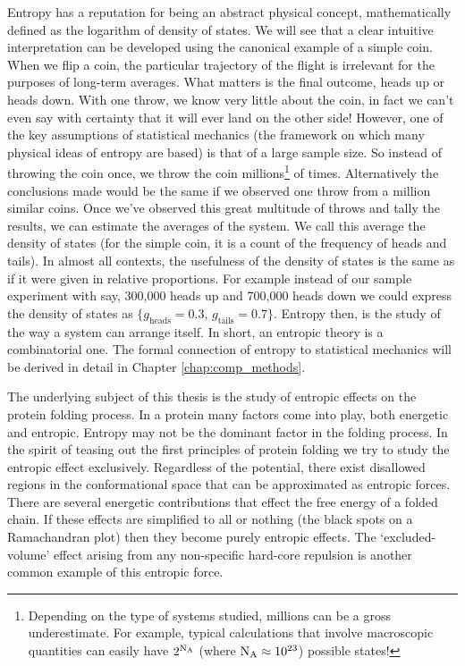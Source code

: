 Entropy has a reputation for being an abstract physical concept, mathematically defined as the logarithm of density of states. We will see that a clear intuitive interpretation can be developed using the canonical example of a simple coin. When we flip a coin, the particular trajectory of the flight is irrelevant for the purposes of long-term averages. What matters is the final outcome, heads up or  heads down. With one throw, we know very little about the coin, in fact we can't even say with certainty that it will ever land on the other side! However, one of the key assumptions of statistical mechanics (the framework on which many physical ideas of entropy are based) is that of a large sample size.  So instead of throwing the coin once, we throw the coin millions\footnote{Depending on the type of systems studied, millions can be a gross underestimate. For example, typical calculations that involve macroscopic quantities can easily have $2^{\mathrm{N_A}}$ (where $\mathrm{N_A} \approx 10^{23}$) possible states!} of times. Alternatively the conclusions made would be the same if we observed one throw from a million similar coins. Once we've observed this great multitude of throws and tally the results, we can estimate the averages of the system. We call this average the density of states (for the simple coin, it is a count of the frequency of heads and tails). In almost all contexts, the usefulness of the density of states is the same as if it were given in relative proportions. For example instead of our sample experiment with say, 300,000 heads up and 700,000 heads down we could express the density of states as $\{ g_{\text{heads}}=0.3$,  $g_{\text{tails}}=0.7 \}$. Entropy then, is the study of the way a system can arrange itself. In short, an entropic theory is a combinatorial one. The formal connection of entropy to statistical mechanics will be derived in detail in Chapter \ref{chap:comp_methods}.

The underlying subject of this thesis is the study of entropic effects on the protein folding process. In a protein many factors come into play, both energetic and entropic. Entropy may not be the dominant factor in the folding process. In the spirit of teasing out the first principles of protein folding we try to study the entropic effect exclusively. Regardless of the potential, there exist disallowed regions in the conformational space that can be approximated as entropic forces. There are several energetic contributions that effect the free energy of a folded chain. If these effects are simplified to all or nothing (\ie the black spots on a Ramachandran plot) then they become purely entropic effects. The `excluded-volume' effect arising from any non-specific hard-core repulsion is another common example of this entropic force. 

